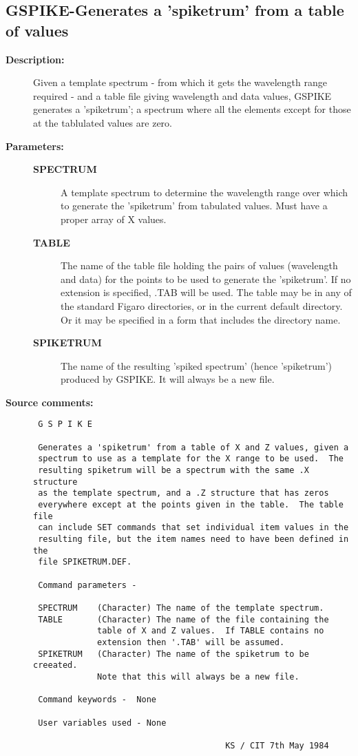 \subsection{GSPIKE-\label{GSPIKE}Generates a 'spiketrum' from a table of values}
\begin{description}

\item [{\bf Description:}]
 Given a template spectrum - from which it gets the wavelength
 range required - and a table file giving wavelength and data
 values, GSPIKE generates a 'spiketrum'; a spectrum where all
 the elements except for those at the tablulated values are
 zero.

\item [{\bf Parameters:}]
\begin{description}
\item [{\bf SPECTRUM}]
 A template spectrum to determine the wavelength
 range over which to generate the 'spiketrum'
 from tabulated values.  Must have a proper
 array of X values.
\item [{\bf TABLE}]
 The name of the table file holding the pairs of
 values (wavelength and data) for the points to be
 used to generate the 'spiketrum'.  If no extension
 is specified, .TAB will be used.  The table may be
 in any of the standard Figaro directories, or in the
 current default directory.  Or it may be specified
 in a form that includes the directory name.
\item [{\bf SPIKETRUM}]
 The name of the resulting 'spiked spectrum'
 (hence 'spiketrum') produced by GSPIKE.  It
 will always be a new file.
\end{description}

\item [{\bf Source comments:}]
\begin{verbatim}
 G S P I K E

 Generates a 'spiketrum' from a table of X and Z values, given a
 spectrum to use as a template for the X range to be used.  The
 resulting spiketrum will be a spectrum with the same .X structure
 as the template spectrum, and a .Z structure that has zeros
 everywhere except at the points given in the table.  The table file
 can include SET commands that set individual item values in the
 resulting file, but the item names need to have been defined in the
 file SPIKETRUM.DEF.

 Command parameters -

 SPECTRUM    (Character) The name of the template spectrum.
 TABLE       (Character) The name of the file containing the
             table of X and Z values.  If TABLE contains no
             extension then '.TAB' will be assumed.
 SPIKETRUM   (Character) The name of the spiketrum to be creeated.
             Note that this will always be a new file.

 Command keywords -  None

 User variables used - None

                                       KS / CIT 7th May 1984
\end{verbatim}
\end{description}
